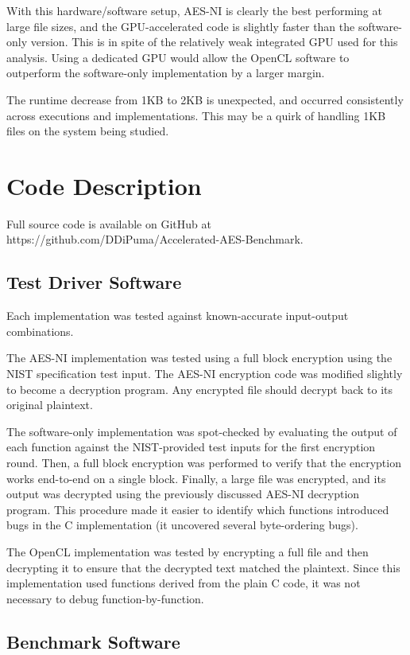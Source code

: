 \documentclass[a4paper,10pt,conference]{IEEEtran}
\begin{document}
With this hardware/software setup, AES-NI is clearly the best performing at large file sizes, and the GPU-accelerated code is slightly faster than the software-only version.  This is in spite of the relatively weak integrated GPU used for this analysis.  Using a dedicated GPU would allow the OpenCL software to outperform the software-only implementation by a larger margin.

The runtime decrease from 1KB to 2KB is unexpected, and occurred consistently across executions and implementations.  This may be a quirk of handling 1KB files on the system being studied.

\section{Code Description}

Full source code is available on GitHub at https://github.com/DDiPuma/Accelerated-AES-Benchmark.

\subsection{Test Driver Software}

Each implementation was tested against known-accurate input-output combinations.

The AES-NI implementation was tested using a full block encryption using the NIST specification test input.  The AES-NI encryption code was modified slightly to become a decryption program.  Any encrypted file should decrypt back to its original plaintext.

The software-only implementation was spot-checked by evaluating the output of each function against the NIST-provided test inputs for the first encryption round.  Then, a full block encryption was performed to verify that the encryption works end-to-end on a single block.  Finally, a large file was encrypted, and its output was decrypted using the previously discussed AES-NI decryption program.  This procedure made it easier to identify which functions introduced bugs in the C implementation (it uncovered several byte-ordering bugs).

The OpenCL implementation was tested by encrypting a full file and then decrypting it to ensure that the decrypted text matched the plaintext.  Since this implementation used functions derived from the plain C code, it was not necessary to debug function-by-function.

\subsection{Benchmark Software}
\end{document}
